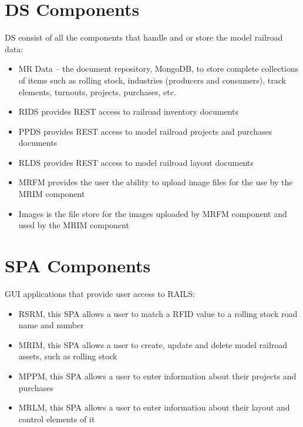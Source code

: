 \section{\acl{DS} Components}
\ac{DS} consist of all the components that handle and or store the model railroad data:
\begin{itemize}
  \item MR Data – the document repository, MongoDB, to store complete collections of items such as rolling stock, industries (producers and consumers), track elements, turnouts, projects, purchases, etc.
  \item \ac{RIDS} provides REST access to railroad inventory documents
  \item \ac{PPDS} provides REST access to model railroad projects and purchases documents
  \item \ac{RLDS} provides REST access to model railroad layout documents
  \item \ac{MRFM} provides the user the ability to upload image files for the use by the \ac{MRIM} component
  \item Images is the file store for the images uploaded by \ac{MRFM} component and used by the \ac{MRIM} component
\end{itemize}
\section{\acl{SPA} Components}
\ac{GUI} applications that provide user access to RAILS:
\begin{itemize}
  \item \ac{RSRM}, this \ac{SPA} allows a user to match a RFID value to a rolling stock road name and number
  \item \ac{MRIM}, this \ac{SPA} allows a user to create, update and delete model railroad assets, such as rolling stock
  \item \ac{MPPM}, this \ac{SPA} allows a user to enter information about their projects and purchases
  \item \ac{MRLM}, this \ac{SPA} allows a user to enter information about their layout and control elements of it
\end{itemize}
